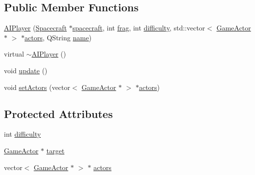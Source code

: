 \subsection*{Public Member Functions}
\begin{DoxyCompactItemize}
\item 
\hyperlink{class_a_i_player_a80fe585fd3aa65aeeef5feb52fa76827}{A\+I\+Player} (\hyperlink{class_spacecraft}{Spacecraft} $\ast$\hyperlink{class_player_a7cc88a054d2329b1ca7472a86b2030ca}{spacecraft}, int \hyperlink{class_player_a9528a6db252f2fe947fd7d9189837aec}{frag}, int \hyperlink{class_a_i_player_ae4bc7d7fef8e20ac68867af09b365e21}{difficulty}, std\+::vector$<$ \hyperlink{class_game_actor}{Game\+Actor} $\ast$ $>$ $\ast$\hyperlink{class_a_i_player_a624129174d82f2462320badcd3bfa598}{actors}, Q\+String \hyperlink{class_player_ac41b72814d9c41222dac999bc874280b}{name})
\item 
virtual \hyperlink{class_a_i_player_a2d879575d692d246da3890b6234104b8}{$\sim$\+A\+I\+Player} ()
\item 
void \hyperlink{class_a_i_player_a37a689ed5d72b91e9e1ea2465c9d9b33}{update} ()
\item 
void \hyperlink{class_a_i_player_a21fcfe0e49e5d03ce3954c525aeb33c0}{set\+Actors} (vector$<$ \hyperlink{class_game_actor}{Game\+Actor} $\ast$ $>$ $\ast$\hyperlink{class_a_i_player_a624129174d82f2462320badcd3bfa598}{actors})
\end{DoxyCompactItemize}
\subsection*{Protected Attributes}
\begin{DoxyCompactItemize}
\item 
int \hyperlink{class_a_i_player_ae4bc7d7fef8e20ac68867af09b365e21}{difficulty}
\item 
\hyperlink{class_game_actor}{Game\+Actor} $\ast$ \hyperlink{class_a_i_player_a9380be8a90d97dc0419cb91dfd0e8918}{target}
\item 
vector$<$ \hyperlink{class_game_actor}{Game\+Actor} $\ast$ $>$ $\ast$ \hyperlink{class_a_i_player_a624129174d82f2462320badcd3bfa598}{actors}
\end{DoxyCompactItemize}


